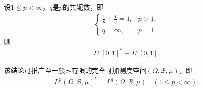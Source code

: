 \documentclass[../../main.tex]{subfiles}%
\begin{document}
\begin{proposition}
设$1\leqslant p<\infty$，$q$是$p$的共轭数，即
\begin{align*}
\begin{cases}
\frac{1}{p}+\frac{1}{q}=1,& p>1,\\
q=\infty,& p=1.
\end{cases}
\end{align*}
则
\begin{align}
L^p[0,1]^*=L^q[0,1].\label{eq:lpconj}
\end{align}
\end{proposition}
\begin{remark}
该结论可推广至一般$\sigma$-有限的完全可加测度空间$(\Omega,\mathscr{B},\mu)$，即
\begin{align}
L^p(\Omega,\mathscr{B},\mu)^*=L^q(\Omega,\mathscr{B},\mu)\quad(1\leqslant p<\infty).\label{eq:lpgenconj}
\end{align}
\end{remark}
\end{document}
